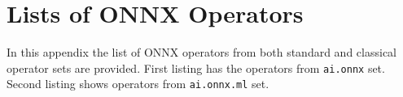 \documentclass[english, 12pt, a4paper, elec, utf8, online]{aaltothesis}
\begin{document}
\clearpage

\thesisbibliography
{}




\clearpage
\thesisappendix
\section{Lists of ONNX Operators\label{appendix:operatorlist}}
In this appendix the list of ONNX operators from both standard and classical operator sets are provided. First listing has the operators from \texttt{ai.onnx} set. Second listing  shows operators from \texttt{ai.onnx.ml} set.  


\end{document}
